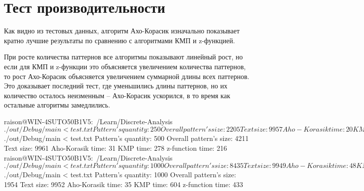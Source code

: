 \section{Тест производительности}
Как видно из тестовых данных, алгоритм Ахо-Корасик изначально показывает кратно лучшие результаты по сравнению с алгоритмами КМП и z-функцией.

При росте количества паттернов все алгоритмы показывают линейный рост, но если для КМП и z-функции это объясняется увеличением количества паттернов, то рост Ахо-Корасик объясняется увеличением суммарной длины всех паттернов. Это доказывает последний тест, где уменьшились длины паттернов, но их количество осталось неизменным -- Ахо-Корасик ускорился, в то время как остальные алгоритмы замедлились.
\begin{verbatim*}
raison@WIN-4SUTO50B1V5:~/Learn/Discrete-Analysis$ ./out/Debug/main < test.txt
Pattern's quantity: 250
Overall pattern's size: 2205
Text size: 9957
Aho-Korasik time: 20
KMP time: 164
z-function time: 103
raison@WIN-4SUTO50B1V5:~/Learn/Discrete-Analysis$ ./out/Debug/main < test.txt 
Pattern's quantity: 500
Overall pattern's size: 4211
Text size: 9961
Aho-Korasik time: 31
KMP time: 278
z-function time: 216
raison@WIN-4SUTO50B1V5:~/Learn/Discrete-Analysis$ ./out/Debug/main < test.txt 
Pattern's quantity: 1000
Overall pattern's size: 8435
Text size: 9949
Aho-Korasik time: 48
KMP time: 562
z-function time: 429
raison@WIN-4SUTO50B1V5:~/Learn/Discrete-Analysis$ ./out/Debug/main < test.txt
Pattern's quantity: 1000
Overall pattern's size: 1954
Text size: 9952
Aho-Korasik time: 35
KMP time: 604
z-function time: 433
\end{verbatim*}

\pagebreak


